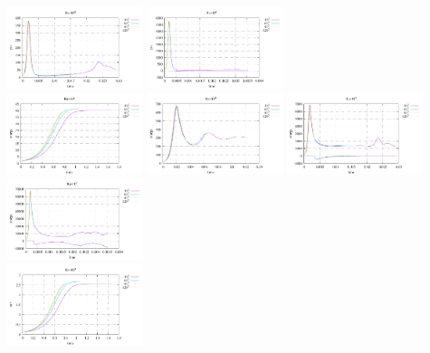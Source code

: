 \begin{center}
\includegraphics[width=3.97cm]{python_codes/fieldstone_155/results/stats_psi_Ra1e5}
\includegraphics[width=3.97cm]{python_codes/fieldstone_155/results/stats_psi_Ra1e6}\\
\includegraphics[width=3.97cm]{python_codes/fieldstone_155/results/stats_omega_Ra1e3}
\includegraphics[width=3.97cm]{python_codes/fieldstone_155/results/stats_omega_Ra1e4}
\includegraphics[width=3.97cm]{python_codes/fieldstone_155/results/stats_omega_Ra1e5}
\includegraphics[width=3.97cm]{python_codes/fieldstone_155/results/stats_omega_Ra1e6}
\\
\includegraphics[width=3.97cm]{python_codes/fieldstone_155/results/avrg_u_Ra1e3}

\end{center}
